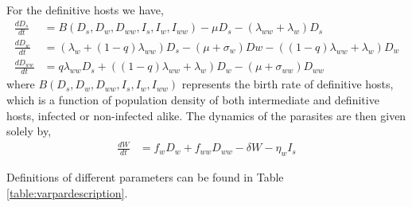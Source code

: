 \documentclass{article}
\begin{document}
For the definitive hosts we have,
\begin{align}
\frac{dD_s}{dt} &= B(D_s,  D_w,  D_{ww},  I_s, I_w, I_{ww})  - \mu D_s - (\lambda_{ww} + \lambda_w) D_s \nonumber \\    
\frac{dD_w}{dt} &= (\lambda_w + (1 - q) \lambda_{ww}) D_s - (\mu + \sigma_w) Dw - ((1 - q) \lambda_{ww} + \lambda_w) D_w  \label{odes:dhosts} \\         
\frac{dD_{ww}}{dt} &= q \lambda_{ww} D_s + ((1 - q) \lambda_{ww} + \lambda_w) D_w - (\mu + \sigma_{ww}) D_{ww} \nonumber
\end{align}
%
where $B(D_s, D_w, D_{ww}, I_s, I_w, I_{ww})$ represents the birth rate of definitive hosts, which is a function of population density of both intermediate and definitive hosts, infected or non-infected alike. 
The dynamics of the parasites are then given solely by,
\begin{align}
	\frac{dW}{dt} &= f_w D_w + f_{ww} D_{ww} - \delta W - \eta_w I_s \label{odes:eparasite}
\end{align}


Definitions of different parameters can be found in Table \ref{table:varpardescription}.
\end{document}

